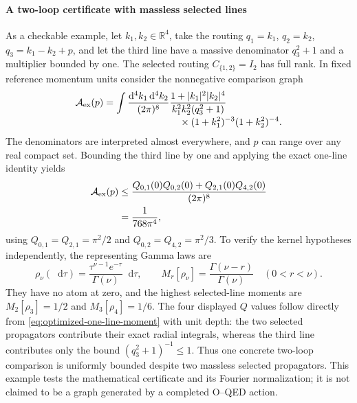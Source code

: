 \documentclass[final,5p,times,twocolumn,numbers,nopreprintline]{elsarticle}
\numberwithin{equation}{section}
\theoremstyle{definition}
\theoremstyle{remark}
\newcommand{\dd}{\mathop{}\!\mathrm d}
\newcommand{\RR}{\mathbb R}
\begin{document}
\paragraph{A two-loop certificate with massless selected lines}
\label{par:two-loop-certificate}
As a checkable example, let \(k_1,k_2\in\RR^4\), take the routing
\(q_1=k_1\), \(q_2=k_2\), \(q_3=k_1-k_2+p\), and let the third
line have a massive denominator \(q_3^2+1\) and a multiplier
bounded by one. The selected routing \(C_{\{1,2\}}=I_2\) has full
rank. In fixed reference momentum units consider the nonnegative
comparison graph
\begin{equation}
 \begin{aligned}
 \mathcal A_{\rm ex}(p)=\int
 \frac{\dd^4k_1\dd^4k_2}{(2\pi)^8}
 &\frac{1+|k_1|^2|k_2|^4}{k_1^2k_2^2(q_3^2+1)}\,\\[-2pt]
 &\quad\times(1+k_1^2)^{-3}(1+k_2^2)^{-4}.
 \end{aligned}
 \label{eq:two-loop-selected-example}
\end{equation}
The denominators are interpreted almost everywhere, and \(p\)
can range over any real compact set. Bounding the third line by one
and applying the exact one-line identity yields
\begin{equation}
 \begin{aligned}
 \mathcal A_{\rm ex}(p)
 &\leq\frac{Q_{0,1}(0)Q_{0,2}(0)
              +Q_{2,1}(0)Q_{4,2}(0)}{(2\pi)^8}\\
 &=\frac{1}{768\pi^4},
 \end{aligned}
 \label{eq:two-loop-selected-certificate}
\end{equation}
using \(Q_{0,1}=Q_{2,1}=\pi^2/2\) and
\(Q_{0,2}=Q_{4,2}=\pi^2/3\). To verify the kernel hypotheses
independently, the representing Gamma laws are
\[
 \rho_\nu(\dd\tau)
 =\frac{\tau^{\nu-1}e^{-\tau}}{\Gamma(\nu)}\dd\tau,
 \qquad
 M_r[\rho_\nu]=\frac{\Gamma(\nu-r)}{\Gamma(\nu)}
 \quad(0<r<\nu).
\]
They have no atom at zero, and the highest selected-line moments are
\(M_2[\rho_3]=1/2\) and \(M_3[\rho_4]=1/6\).
The four displayed $Q$ values follow directly from
\eqref{eq:optimized-one-line-moment} with unit depth: the two
selected propagators contribute their exact radial integrals,
whereas the third line contributes only the bound
$(q_3^2+1)^{-1}\leq1$.
Thus one concrete two-loop comparison is uniformly bounded despite
two massless selected propagators. This example tests the
mathematical certificate and its Fourier normalization; it is not
claimed to be a graph generated by a completed O--QED action.
\end{document}
